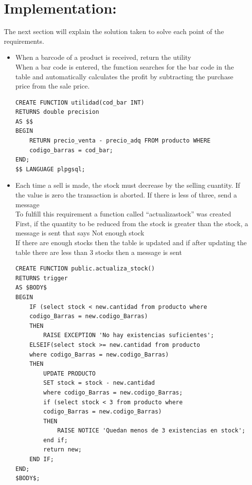\documentclass{article}
\begin{document}
\section{Implementation:}

The next section will explain the solution taken to solve each point of the requirements.\\

\begin{itemize}
\item When a barcode of a product is received, return the utility\\

When a bar code is entered, the function searches for the bar code in the table and automatically calculates the profit by subtracting the purchase price from the sale price.\\

\begin{lstlisting}
CREATE FUNCTION utilidad(cod_bar INT)
RETURNS double precision
AS $$
BEGIN
	RETURN precio_venta - precio_adq FROM producto WHERE 
	codigo_barras = cod_bar;
END;
$$ LANGUAGE plpgsql;
\end{lstlisting}

\item Each time a sell is made, the stock must decrease by the selling cuantity. If the value is zero the transaction is aborted. If there is less of three, send a message\\

To fulfill this requirement a function called “actualiza\textunderscore stock” was created\\

First, if the quantity to be reduced from the stock is greater than the stock, a message is sent that says Not enough stock \\

If there are enough stocks then the table is updated and if after updating the table there are less than 3 stocks then a message is sent \\

\begin{lstlisting}
CREATE FUNCTION public.actualiza_stock()
RETURNS trigger
AS $BODY$
BEGIN
	IF (select stock < new.cantidad from producto where 
	codigo_Barras = new.codigo_Barras) 
	THEN 
		RAISE EXCEPTION 'No hay existencias suficientes';
	ELSEIF(select stock >= new.cantidad from producto 
	where codigo_Barras = new.codigo_Barras)
	THEN
		UPDATE PRODUCTO
		SET stock = stock - new.cantidad 
		where codigo_Barras = new.codigo_Barras;
		if (select stock < 3 from producto where 
		codigo_Barras = new.codigo_Barras)
		THEN
			RAISE NOTICE 'Quedan menos de 3 existencias en stock';
		end if;
		return new;
	END IF;
END;
$BODY$;
\end{lstlisting}


\end{itemize}
\end{document}
